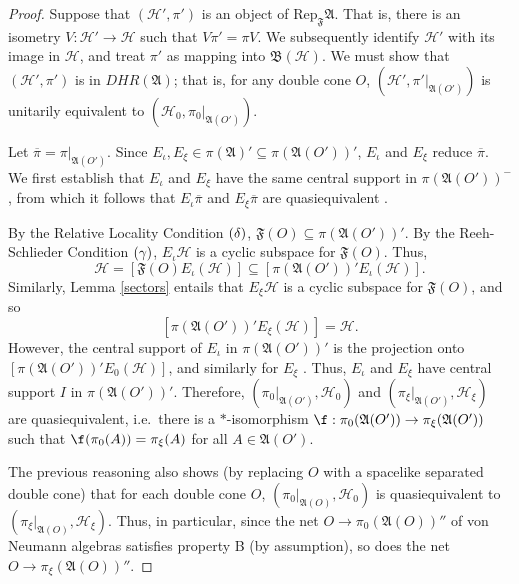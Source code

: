 \documentclass[11pt]{article}
\newcommand{\alg}[1]{\mathfrak{#1}}
\newcommand{\bh}{\mathfrak{B}(\mathcal{H})}
\theoremstyle{definition}
\theoremstyle{definition}
\theoremstyle{remark}
\def\2#1{{\mathcal #1}}
\def\ol#1{{\overline #1}}
\def\al#1{{\mathfrak #1}}
\newcommand{\Rep}{\mathrm{Rep}}
\begin{document}
\begin{proof} Suppose that $(\2H ',\pi ')$ is an object of $\Rep _{\al
    F}\al A$.  That is, there is an isometry $V:\2H '\to \2H$ such
  that $V\pi '=\pi V$.  We subsequently identify $\2H '$ with its
  image in $\2H$, and treat $\pi '$ as mapping into $\bh$.  We must
  show that $(\2H ',\pi ')$ is in $DHR(\al A)$; that is, for any
  double cone $O$, $(\2H ',\pi '|_{\alg{A}(O')})$ is unitarily
  equivalent to $(\2H_0,\pi _0|_{\alg{A}(O')})$.  

  Let $\overline{\pi}=\pi |_{\alg{A}(O')}$.  Since
  $E_{\iota},E_{\xi}\in \pi (\alg{A})'\subseteq \pi
  (\alg{A}(O'))'$, $E_{\iota}$ and $E_{\xi}$ reduce
  $\overline{\pi}$.  We first establish that
  $E_{\iota}$ and $E_{\xi}$ have the same central
  support in $\pi (\alg{A}(O'))^{-}$, from which it
  follows that $E_{\iota}\ol\pi$ and $E_{\xi}\ol\pi$
  are quasiequivalent \cite[Thm.\ 10.3.3]{kr}.

  By the Relative Locality Condition $(\boldmath{\delta})$,
  $\alg{F}(O)\subseteq \pi (\alg{A}(O'))'$.  By the Reeh-Schlieder
  Condition $(\boldmath{\gamma})$, $E_{\iota}\2H$ is a cyclic subspace
  for $\alg{F}(O)$.  Thus,
$$ \2H =[\alg{F}(O)E_{\iota}(\2H )]\subseteq [\pi (\alg{A}(O'))'E_{\iota}(\2H )] .$$  
Similarly, Lemma \ref{sectors} entails that
$E_{\xi}\2H$ is a cyclic subspace for $\alg{F}(O)$, and
so $$[\pi (\alg{A}(O'))'E_{\xi}(\2H )]=\2H.$$
However,
the central support of $E_\iota$ in $\pi
(\alg{A}(O'))'$ is the projection onto
$[\pi(\alg{A}(O'))'E_0(\2H )]$, and similarly for
$E_{\xi}$ \cite[Prop.\ 5.5.2]{kr}.  Thus, $E_{\iota}$
and $E_{\xi}$ have central support $I$ in $\pi
(\alg{A}(O'))'$.  Therefore, $(\pi
_{0}|_{\alg{A}(O')},\2H _0)$ and $(\pi
_{\xi}|_{\alg{A}(O')},\2H _{\xi})$ are quasiequivalent,
i.e.\ there is a $*$-isomorphism $\f :\pi
_0(\alg{A}(O'))\to \pi _{\xi}(\alg{A}(O'))$ such that
$\f (\pi _0(A))=\pi _{\xi}(A)$ for all $A\in
\alg{A}(O')$.

The previous reasoning also shows (by replacing $O$ with a spacelike
separated double cone) that for each double cone $O$, $(\pi
_{0}|_{\alg{A}(O)},\2H_0)$ is quasiequivalent to $(\pi
_{\xi}|_{\alg{A}(O)},\2H _{\xi})$.  Thus, in particular, since the net
$O\to \pi _0(\alg{A}(O))''$ of von Neumann algebras satisfies property
B (by assumption), so does the net $O\to \pi _{\xi}(\alg{A}(O))''$.


\end{proof}
\end{document}
